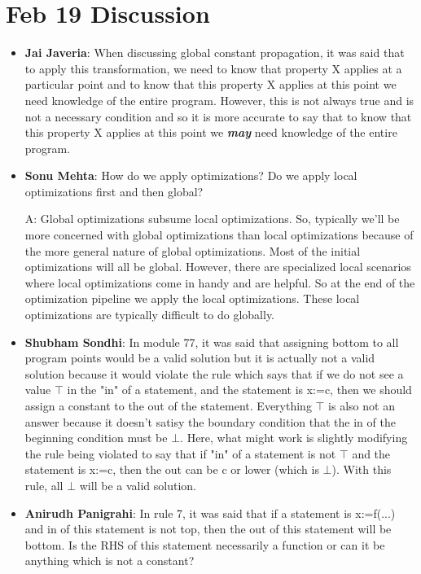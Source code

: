\clearpage
\section{Feb 19 Discussion}
\begin{itemize}
    \item \textbf{Jai Javeria}: When discussing global constant propagation, it was said that to apply this transformation, we need to know that property X applies at a particular point and to know that this property X applies at this point we need knowledge of the entire program. However, this is not always true and is not a necessary condition and so it is more accurate to say that to know that this property X applies at this point we \textbf{\textit{may}} need knowledge of the entire program.
    
    \item \textbf{Sonu Mehta}: How do we apply optimizations? Do we apply local optimizations first and then global?

    A: Global optimizations subsume local optimizations. So, typically we'll be more concerned with global optimizations than local optimizations because of the more general nature of global optimizations. Most of the initial optimizations will all be global. However, there are specialized local scenarios where local optimizations come in handy and are helpful. So at the end of the optimization pipeline we apply the local optimizations. These local optimizations are typically difficult to do globally.
    
    \item \textbf{Shubham Sondhi}: In module 77, it was said that assigning bottom to all program points would be a valid solution but it is actually not a valid solution because it would violate the rule which says that if we do not see a value $\top$ in the "in" of a statement, and the statement is x:=c, then we should assign a constant to the out of the statement. Everything $\top$ is also not an answer because it doesn't satisy the boundary condition that the in of the beginning condition must be $\bot$. Here, what might work is slightly modifying the rule being violated to say that if "in" of a statement is not $\top$ and the statement is x:=c, then the out can be c or lower (which is $\bot$). With this rule, all $\bot$ will be a valid solution. 
    
    \item \textbf{Anirudh Panigrahi}: In rule 7, it was said that if a statement is x:=f(...) and in of this statement is not top, then the out of this statement will be bottom. Is the RHS of this statement necessarily a function or can it be anything which is not a constant?
    

\end{itemize}
